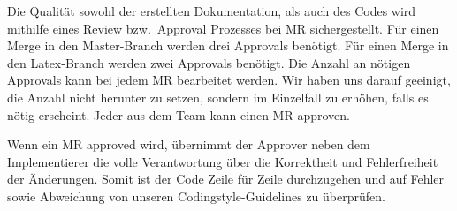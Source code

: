 Die Qualität sowohl der erstellten Dokumentation, als auch des Codes
wird mithilfe eines Review bzw.\ Approval Prozesses bei MR sichergestellt.
Für einen Merge in den Master-Branch werden drei Approvals benötigt.
Für einen Merge in den Latex-Branch werden zwei Approvals benötigt.
Die Anzahl an nötigen Approvals kann bei jedem MR bearbeitet werden.
Wir haben uns darauf geeinigt, die Anzahl nicht herunter zu setzen,
sondern im Einzelfall zu erhöhen, falls es nötig erscheint.
Jeder aus dem Team kann einen MR approven.

Wenn ein MR approved wird, übernimmt der Approver neben dem Implementierer die volle Verantwortung
über die Korrektheit und Fehlerfreiheit der Änderungen.
Somit ist der Code Zeile für Zeile durchzugehen und auf Fehler sowie Abweichung von
unseren Codingstyle-Guidelines zu überprüfen.


